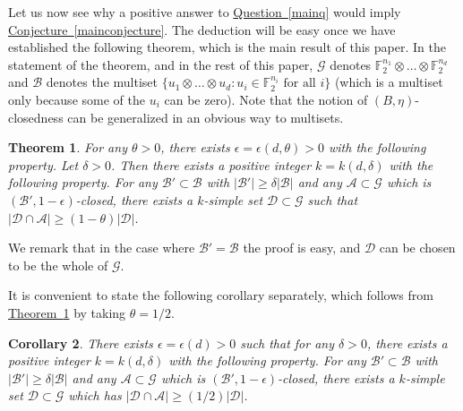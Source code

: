 \documentclass[11pt]{article}
\numberwithin{equation}{section}
\newtheorem{theorem}{Theorem}[section]
\newtheorem{corollary}[theorem]{Corollary}
\theoremstyle{definition}
\theoremstyle{plain}
\newcommand{\expref}[2]{\hyperref[#2]{#1~\ref{#2}}}
\newcommand\eps{\epsilon}  %
\newcommand\F{\mathbb{F}}
\renewcommand\d{\delta}
\newcommand \cA{\mathcal A}
\newcommand \cB{\mathcal B}
\newcommand \cD{\mathcal D}
\newcommand \cG{\mathcal G}
\begin{document}
Let us now see why a positive answer to \expref{Question}{mainq} would imply \expref{Conjecture}{mainconjecture}. The deduction will be easy once we have established the following theorem, which is the main result of this paper. In the statement of the theorem, and in the rest of this paper, $\cG$ denotes $\F_2^{n_1}\otimes \dots \otimes \F_2^{n_d}$ and $\cB$ denotes the multiset $\{u_1\otimes \dots \otimes u_d: u_i\in \F_2^{n_i} \text{ for all } i\}$ (which is a multiset only because some of the $u_i$ can be zero). Note that the notion of $(B,\eta)$-closedness can be generalized in an obvious way to multisets.


\begin{theorem} \label{mainresult}
	For any $\theta>0$, there exists $\eps=\eps(d,\theta)>0$ with the following property. Let $\delta>0$. Then there exists a positive integer $k=k(d,\d)$ with the following property. For any $\cB'\subset \cB$ with $|\cB'|\geq \d |\cB|$ and any $\cA\subset \cG$ which is  $(\cB',1-\eps)$-closed, there exists a $k$-simple set $\cD\subset \cG$ such that $|\cD\cap \cA|\geq (1-\theta)|\cD|$.
\end{theorem}


\noindent We remark that in the case where $\cB'=\cB$ the proof is easy, and $\cD$ can be chosen to be the whole of $\cG$.
%
%
%
%
%
%
%
%

It is convenient to state the following corollary separately, which follows from \expref{Theorem}{mainresult} by taking $\theta=1/2$.

\begin{corollary} \label{maincorollary}
	There exists $\eps=\eps(d)>0$ such that for any $\delta>0$, there exists a positive integer $k=k(d,\d)$ with the following property. For any $\cB'\subset \cB$ with $|\cB'|\geq \d |\cB|$ and any $\cA\subset \cG$ which is  $(\cB',1-\eps)$-closed, there exists a $k$-simple set $\cD\subset \cG$ which has $|\cD\cap \cA|\geq ({1}/{2})|\cD|$.
\end{corollary}
\end{document}
